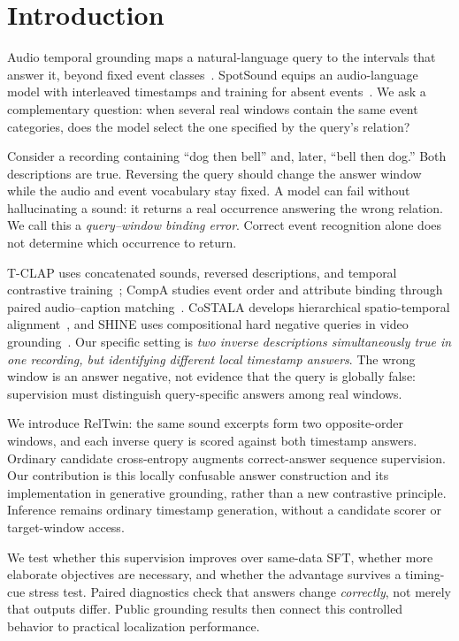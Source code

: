 \section{Introduction}
Audio temporal grounding maps a natural-language query to the intervals that answer it, beyond fixed event classes~\cite{xu2021grounding,munakata2025amr}. SpotSound equips an audio-language model with interleaved timestamps and training for absent events~\cite{sun2026spotsound}. We ask a complementary question: when several real windows contain the same event categories, does the model select the one specified by the query's relation?

Consider a recording containing ``dog then bell'' and, later, ``bell then dog.'' Both descriptions are true. Reversing the query should change the answer window while the audio and event vocabulary stay fixed. A model can fail without hallucinating a sound: it returns a real occurrence answering the wrong relation. We call this a \emph{query--window binding error}. Correct event recognition alone does not determine which occurrence to return.

T-CLAP uses concatenated sounds, reversed descriptions, and temporal contrastive training~\cite{yuan2024tclap}; CompA studies event order and attribute binding through paired audio--caption matching~\cite{ghosh2024compa}. CoSTALA develops hierarchical spatio-temporal alignment~\cite{ren2026costala}, and SHINE uses compositional hard negative queries in video grounding~\cite{cheng2024shine}. Our specific setting is \emph{two inverse descriptions simultaneously true in one recording, but identifying different local timestamp answers}. The wrong window is an answer negative, not evidence that the query is globally false: supervision must distinguish query-specific answers among real windows.

We introduce RelTwin: the same sound excerpts form two opposite-order windows, and each inverse query is scored against both timestamp answers. Ordinary candidate cross-entropy augments correct-answer sequence supervision. Our contribution is this locally confusable answer construction and its implementation in generative grounding, rather than a new contrastive principle. Inference remains ordinary timestamp generation, without a candidate scorer or target-window access.

We test whether this supervision improves over same-data SFT, whether more elaborate objectives are necessary, and whether the advantage survives a timing-cue stress test. Paired diagnostics check that answers change \emph{correctly}, not merely that outputs differ. Public grounding results then connect this controlled behavior to practical localization performance.
